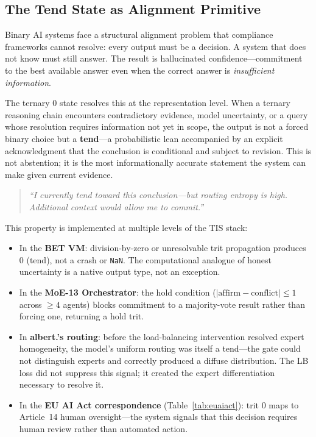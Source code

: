 \documentclass[11pt,a4paper]{article}
\begin{document}
\subsection{The Tend State as Alignment Primitive}
\label{subsec:tend_state}

Binary AI systems face a structural alignment problem that compliance
frameworks cannot resolve: every output must be a decision. A system that
does not know must still answer. The result is hallucinated
confidence---commitment to the best available answer even when the correct
answer is \emph{insufficient information}.

The ternary $0$ state resolves this at the representation level. When a
ternary reasoning chain encounters contradictory evidence, model uncertainty,
or a query whose resolution requires information not yet in scope, the output
is not a forced binary choice but a \textbf{tend}---a probabilistic lean
accompanied by an explicit acknowledgment that the conclusion is conditional
and subject to revision. This is not abstention; it is the most
informationally accurate statement the system can make given current evidence.

\begin{quote}
  \emph{``I currently tend toward this conclusion---but routing entropy is
  high. Additional context would allow me to commit.''}
\end{quote}

This property is implemented at multiple levels of the TIS stack:

\begin{itemize}
  \item In the \textbf{BET VM}: division-by-zero or unresolvable trit
        propagation produces $0$ (tend), not a crash or \texttt{NaN}.
        The computational analogue of honest uncertainty is a native output
        type, not an exception.
  \item In the \textbf{MoE-13 Orchestrator}: the hold condition
        ($|\text{affirm} - \text{conflict}| \leq 1$ across $\geq 4$ agents)
        blocks commitment to a majority-vote result rather than forcing one,
        returning a hold trit.
  \item In \textbf{albert.'s routing}: before the load-balancing intervention
        resolved expert homogeneity, the model's uniform routing was itself
        a tend---the gate could not distinguish experts and correctly produced
        a diffuse distribution. The LB loss did not suppress this signal; it
        created the expert differentiation necessary to resolve it.
  \item In the \textbf{EU AI Act correspondence}
        (Table~\ref{tab:euaiact}): trit $0$ maps to Article~14 human
        oversight---the system signals that this decision requires human
        review rather than automated action.
\end{itemize}
\end{document}
